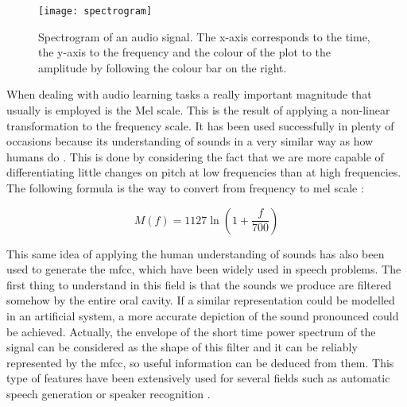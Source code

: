 	\begin{figure}[H]
		\centering
		\captionsetup{justification=centering}
		\texttt{[image: spectrogram]}
		\caption{Spectrogram of an audio signal. The x-axis corresponds to the time, the y-axis to the frequency and the colour of the plot to the amplitude by following the colour bar on the right.}
		\label{fig:mesh51}
	\end{figure}

	When dealing with audio learning tasks a really important magnitude that usually is employed is the Mel scale. This is the result of applying a non-linear transformation to the frequency scale. It has been used successfully in plenty of occasions because its understanding of sounds in a very similar way as how humans do \cite{Gartzman2019}. This is done by considering the fact that we are more capable of differentiating little changes on pitch at low frequencies than at high frequencies. The following formula is the way to convert from frequency to mel scale \cite{Beranek1950}:
	
	\[M(f) = 1127 \ln{(1 + \frac{f}{700})}\]
	
	This same idea of applying the human understanding of sounds has also been used to generate the \acrfull{mfcc}, which have been widely used in speech problems. The first thing to understand in this field is that the sounds we produce are filtered somehow by the entire oral cavity. If a similar representation could be modelled in an artificial system, a more accurate depiction of the sound pronounced could be achieved. Actually, the envelope of the short time power spectrum of the signal can be considered as the shape of this filter and it can be reliably represented by the \acrshort{mfcc}, so useful information can be deduced from them. This type of features have been extensively used for several fields such as automatic speech generation or speaker recognition \cite{Giannakopoulos2014}. 
	
	
	
	
	